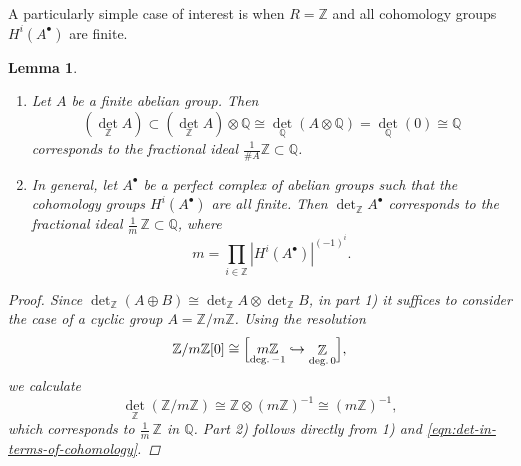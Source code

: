 \documentclass[10pt,a4paper,oneside]{article}
\newcommand{\QQ}{\mathbb{Q}}
\newcommand{\ZZ}{\mathbb{Z}}
\renewcommand{\det}{\operatorname{det}}
\theoremstyle{myplain}
\newtheorem{lemma}[theorem]{Lemma}
\theoremstyle{mydefinition}
\numberwithin{equation}{section}
\begin{document}
\begin{appendices}
A particularly simple case of interest is when $R = \ZZ$ and all cohomology
groups $H^i (A^\bullet)$ are finite.

\begin{lemma}
  \label{lemma:determinant-for-torsion-cohomology}
  ~

  \begin{enumerate}
  \item[1)] Let $A$ be a finite abelian group. Then
    \[ (\det_\ZZ A) \subset (\det_\ZZ A) \otimes \QQ
      \cong \det_\QQ (A \otimes \QQ) = \det_\QQ (0) \cong \QQ \]
    corresponds to the fractional ideal $\frac{1}{\# A} \ZZ \subset \QQ$.

  \item[2)] In general, let $A^\bullet$ be a perfect complex of abelian groups
    such that the cohomology groups $H^i (A^\bullet)$ are all finite. Then
    $\det_\ZZ A^\bullet$ corresponds to the fractional ideal
    $\frac{1}{m}\,\ZZ \subset \QQ$, where
    $$m = \prod_{i\in \ZZ} |H^i (A^\bullet)|^{(-1)^i}.$$
  \end{enumerate}

  \begin{proof}
    Since $\det_\ZZ (A\oplus B) \cong \det_\ZZ A \otimes \det_\ZZ B$, in
    part 1) it suffices to consider the case of a cyclic group
    $A = \ZZ/m\ZZ$. Using the resolution
    \[ \ZZ/m\ZZ [0] \cong \Bigl[
      \mathop{m\ZZ}_{\text{deg.\,}-1} \hookrightarrow
      \mathop{\ZZ}_{\text{deg.\,}0}
      \Bigr], \]
    we calculate
    $$\det_\ZZ (\ZZ/m\ZZ) \cong \ZZ \otimes (m\ZZ)^{-1} \cong (m\ZZ)^{-1},$$
    which corresponds to $\frac{1}{m}\,\ZZ$ in $\QQ$.
    Part 2) follows directly from 1) and \eqref{eqn:det-in-terms-of-cohomology}.
  \end{proof}
\end{lemma}

\end{appendices}




\end{document}
